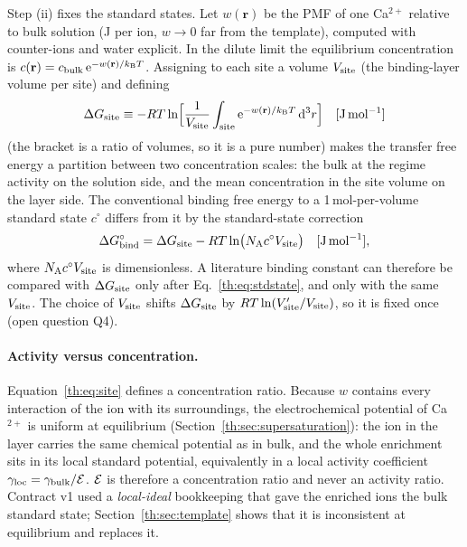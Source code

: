 Step (ii) fixes the standard states. Let $w(\mathbf r)$ be the PMF of one Ca$^{2+}$ relative to
bulk solution (J per ion, $w\to0$ far from the template), computed with counter-ions and water
explicit. In the dilute limit the equilibrium concentration is $c(\mathbf r)=c_\mathrm{bulk}\,\mathrm{e}^{-w(\mathbf r)/k_\mathrm{B} T}$.
Assigning to each site a volume $V_\mathrm{site}$ (the binding-layer volume per site) and defining
\begin{equation}\label{th:eq:site}
\Delta G_\mathrm{site}\equiv-R T\ln\!\Big[\frac{1}{V_\mathrm{site}}\int_{\mathrm{site}}\mathrm{e}^{-w(\mathbf r)/k_\mathrm{B} T}\,\mathrm{d}^3 r\Big] \quad[\mathrm{J\,mol^{-1}}]
\end{equation}
(the bracket is a ratio of volumes, so it is a pure number) makes the transfer free energy a
partition between two concentration scales: the bulk at the regime activity on the solution
side, and the mean concentration in the site volume on the layer side. The conventional binding
free energy to a 1\,mol-per-volume standard state $c^{\circ}$ differs from it by the
standard-state correction
\begin{equation}\label{th:eq:stdstate}
\Delta G^{\circ}_\mathrm{bind}=\Delta G_\mathrm{site}-R T\ln\!\big(N_\mathrm{A} c^{\circ}V_\mathrm{site}\big) \quad[\mathrm{J\,mol^{-1}}],
\end{equation}
where $N_\mathrm{A} c^{\circ}V_\mathrm{site}$ is dimensionless. A literature binding constant can therefore be
compared with $\Delta G_\mathrm{site}$ only after Eq.~\eqref{th:eq:stdstate}, and only with the same $V_\mathrm{site}$.
The choice of $V_\mathrm{site}$ shifts $\Delta G_\mathrm{site}$ by $R T\ln(V_\mathrm{site}'/V_\mathrm{site})$, so it is fixed once
(open question Q4).

\paragraph{Activity versus concentration.} Equation~\eqref{th:eq:site} defines a concentration
ratio. Because $w$ contains every interaction of the ion with its surroundings, the
electrochemical potential of Ca$^{2+}$ is uniform at equilibrium (Section~\ref{th:sec:supersaturation}):
the ion in the layer carries the same chemical potential as in bulk, and the whole enrichment
sits in its local standard potential, equivalently in a local activity coefficient
$\gamma_\mathrm{loc}=\gamma_\mathrm{bulk}/\mathcal{E}$. $\mathcal{E}$ is therefore a concentration ratio and
never an activity ratio. Contract v1 used a \emph{local-ideal} bookkeeping that gave the
enriched ions the bulk standard state; Section~\ref{th:sec:template} shows that it is inconsistent
at equilibrium and replaces it.


